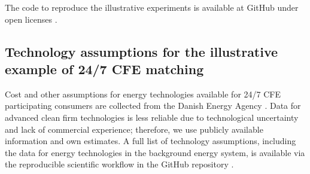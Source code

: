 \documentclass[pdflatex,sn-basic, Numbered]{sn-jnl}%
\theoremstyle{thmstyleone}%
\theoremstyle{thmstyletwo}%
\theoremstyle{thmstylethree}%
\begin{document}
 The code to reproduce the illustrative experiments is available at GitHub under open licenses \cite{code247CFE}.




\FloatBarrier
\newpage

\subsection*{Technology assumptions for the illustrative example of 24/7 CFE matching}
\label{sec:annex}

Cost and other assumptions for energy technologies available for 24/7 CFE participating consumers are collected from the Danish Energy Agency \cite{DEA-technologydata}.
Data for advanced clean firm technologies is less reliable due to technological uncertainty and lack of commercial experience; therefore, we use publicly available information and own estimates.
A full list of technology assumptions, including the data for energy technologies in the background energy system, is available via the reproducible scientific workflow in the GitHub repository \cite{code247CFE}.
\end{document}
